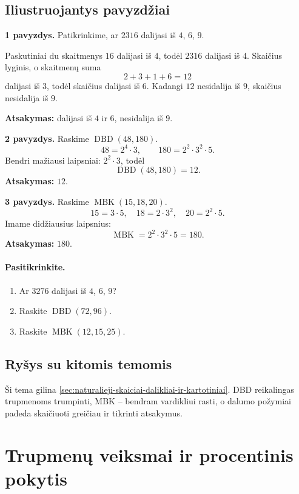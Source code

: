 \subsection{Iliustruojantys pavyzdžiai}
\textbf{1 pavyzdys.} Patikrinkime, ar \(2316\) dalijasi iš \(4\), \(6\), \(9\).

Paskutiniai du skaitmenys \(16\) dalijasi iš \(4\), todėl \(2316\) dalijasi iš \(4\). Skaičius lyginis, o skaitmenų suma
\[
2+3+1+6=12
\]
dalijasi iš \(3\), todėl skaičius dalijasi iš \(6\). Kadangi \(12\) nesidalija iš \(9\), skaičius nesidalija iš \(9\).

\textbf{Atsakymas:} dalijasi iš \(4\) ir \(6\), nesidalija iš \(9\).

\textbf{2 pavyzdys.} Raskime \(\operatorname{DBD}(48,180)\).
\[
48=2^4\cdot 3,\qquad 180=2^2\cdot 3^2\cdot 5.
\]
Bendri mažiausi laipsniai: \(2^2\cdot 3\), todėl
\[
\operatorname{DBD}(48,180)=12.
\]
\textbf{Atsakymas:} \(12\).

\textbf{3 pavyzdys.} Raskime \(\operatorname{MBK}(15,18,20)\).
\[
15=3\cdot 5,\quad 18=2\cdot 3^2,\quad 20=2^2\cdot 5.
\]
Imame didžiausius laipsnius:
\[
\operatorname{MBK}=2^2\cdot 3^2\cdot 5=180.
\]
\textbf{Atsakymas:} \(180\).

\paragraph{Pasitikrinkite.}
\begin{enumerate}[label=\arabic*.]
\item Ar \(3276\) dalijasi iš \(4\), \(6\), \(9\)?
\item Raskite \(\operatorname{DBD}(72,96)\).
\item Raskite \(\operatorname{MBK}(12,15,25)\).
\end{enumerate}

\subsection{Ryšys su kitomis temomis}
Ši tema gilina \ref{sec:naturalieji-skaiciai-dalikliai-ir-kartotiniai}. DBD reikalingas trupmenoms trumpinti, MBK -- bendram vardikliui rasti, o dalumo požymiai padeda skaičiuoti greičiau ir tikrinti atsakymus.

\section{Trupmenų veiksmai ir procentinis pokytis}\label{sec:trupmenu-veiksmai-ir-procentinis-pokytis}

